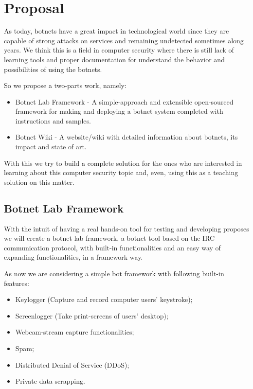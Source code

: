 \documentclass[]{article}
\begin{document}
\section{Proposal}

As today, botnets have a great impact in technological world since they are capable of strong attacks on services and remaining undetected sometimes along years. We think this is a field in computer security where there is still lack of learning tools and proper documentation for understand the behavior and possibilities of using the botnets.

So we propose a two-parts work, namely:
\begin{itemize}
	\item Botnet Lab Framework - A simple-approach and extensible open-sourced framework for making and deploying a botnet system completed with instructions and samples.
	\item Botnet Wiki - A website/wiki with detailed information about botnets, its impact and state of art.
\end{itemize}

With this we try to build a complete solution for the ones who are interested in learning about this computer security topic and, even, using this as a teaching solution on this matter.

\subsection{Botnet Lab Framework}

With the intuit of having a real hands-on tool for testing and developing proposes we will create a botnet lab framework, a botnet tool based on the IRC communication protocol, with built-in functionalities and an easy way of expanding functionalities, in a framework way.

As now we are considering a simple bot framework with following built-in features:

\begin{itemize}
	\item Keylogger (Capture and record computer users' keystroke);
	\item Screenlogger (Take print-screens of users' desktop);
	\item Webcam-stream capture functionalities;
	\item Spam;
	\item Distributed Denial of Service (DDoS);
	\item Private data scrapping.
\end{itemize}
\end{document}
